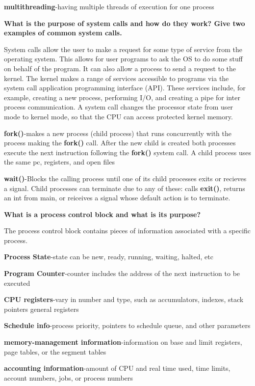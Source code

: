 \documentclass[8pt,landscape]{article}
\begin{document}
\begin{multicols}{3}
\begin{tiny}
\textbf{multithreading}-having multiple threads of execution for one process

\textbf{What is the purpose of system calls and how do they work? Give two examples of common 
system calls.}

System calls allow the user to make a request for some type of service from the operating system.
This allows for user programs to ask the OS to do some stuff on behalf of the program. It can also
allow a process to send a request to the kernel. The kernel makes a range of services accessible 
to programs via the system call application programming interface (API). These services include, 
for example, creating a new process, performing I/O, and creating a pipe for inter process 
communication. A system call changes the processor state from user mode to kernel mode, so that 
the CPU can access protected kernel memory.

\textbf{fork()}-makes a new process (child process) that runs concurrently with the process 
making the \textbf{fork()} call. After the new child is created both processes execute the next
instruction following the \textbf{fork()} system call. A child process uses the same pc, registers,
and open files

\textbf{wait()}-Blocks the calling process until one of its child processes exits or recieves a 
signal. Child processes can terminate due to any of these: calls \textbf{exit()}, returns an int
from main, or reiceives a signal whose default action is to terminate.


\textbf{What is a process control block and what is its purpose?}

The process control block contains pieces of information associated with a specific process.

\textbf{Process State}-state can be new, ready, running, waiting, halted, etc

\textbf{Program Counter}-counter includes the address of the next instruction to be executed

\textbf{CPU registers}-vary in number and type, such as accumulators, indexes, stack pointers
general registers

\textbf{Schedule info}-process priority, pointers to schedule queue, and other parameters

\textbf{memory-management information}-information on base and limit registers, page tables,
or the segment tables

\textbf{accounting information}-amount of CPU and real time used, time limits, account numbers,
jobs, or process numbers


\end{tiny}
\end{multicols}
\end{document}

